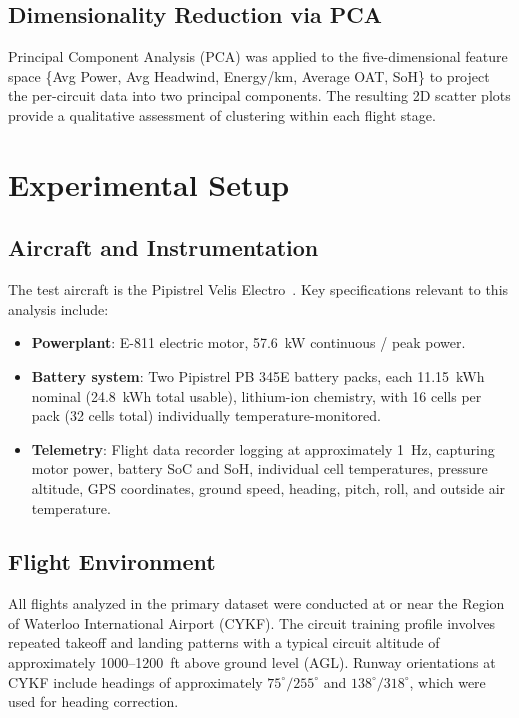 \documentclass[11pt,a4paper]{article}
\begin{document}
\subsection{Dimensionality Reduction via PCA}

Principal Component Analysis (PCA) was applied to the five-dimensional feature space \{Avg Power, Avg Headwind, Energy/km, Average OAT, SoH\} to project the per-circuit data into two principal components.
The resulting 2D scatter plots provide a qualitative assessment of clustering within each flight stage.

\section{Experimental Setup}

\subsection{Aircraft and Instrumentation}

The test aircraft is the Pipistrel Velis Electro~\cite{pipistrel_poh}.
Key specifications relevant to this analysis include:

\begin{itemize}
    \item \textbf{Powerplant}: E-811 electric motor, 57.6~kW continuous / peak power.
    \item \textbf{Battery system}: Two Pipistrel PB 345E battery packs, each 11.15~kWh nominal (24.8~kWh total usable), lithium-ion chemistry, with 16 cells per pack (32 cells total) individually temperature-monitored.
    \item \textbf{Telemetry}: Flight data recorder logging at approximately 1~Hz, capturing motor power, battery SoC and SoH, individual cell temperatures, pressure altitude, GPS coordinates, ground speed, heading, pitch, roll, and outside air temperature.
\end{itemize}

\subsection{Flight Environment}

All flights analyzed in the primary dataset were conducted at or near the Region of Waterloo International Airport (CYKF).
The circuit training profile involves repeated takeoff and landing patterns with a typical circuit altitude of approximately 1000--1200~ft above ground level (AGL).
Runway orientations at CYKF include headings of approximately $75^\circ/255^\circ$ and $138^\circ/318^\circ$, which were used for heading correction.
\end{document}
